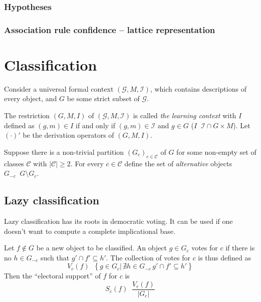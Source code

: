 \documentclass[a4paper]{article}
\newcommand{\obj}[1]{{\left\{ #1 \right \}}}
\newcommand{\brac}[1]{{\left ( #1 \right )}}
\newcommand{\induc}[1]{{\left . #1 \right \vert}}
\newcommand{\abs}[1]{{\left | #1 \right |}}
\newcommand{\Ical}{\mathcal{I}}
\newcommand{\Gcal}{\mathcal{G}}
\newcommand{\defn}{\mathop{\overset{\Delta}{=}}\nolimits}
\begin{document}
\subsubsection{Hypotheses} %
\label{ssub:hypotheses}


\subsubsection{Association rule confidence -- lattice representation} %
\label{ssub:association_rule_confidence_lattice_representation}





\section{Classification} %
\label{sec:classification}

Consider a universal formal context $(\Gcal, M, \Ical)$, which contains descriptions of every object, and $G$ be some strict subset of $\Gcal$.

The restriction $(G,M,I)$ of $(\Gcal,M,\Ical)$ is called \emph{the learning context} with $I$ defined as $(g,m)\in I$ if and only if $(g,m)\in \Ical$ and $g\in G$ ($I\defn \Ical \cap G\times M$). Let ${(\cdot)}'$ be the derivation operators of $(G,M,I)$.

Suppose there is a non-trivial partition $\brac{G_c}_{c\in \mathcal{C}}$ of $G$ for some non-empty set of classes $\mathcal{C}$ with $\abs{\mathcal{C}}\geq 2$. For every $c\in \mathcal{C}$ define the set of \emph{alternative} objects $G_{-c} \defn G\setminus G_c$.

\subsection{Lazy classification} %
\label{sub:lazy_classification}

Lazy classification has its roots in democratic voting. It can be used if one doesn't want to compute a complete implicational base.

Let $f\notin G$ be a new object to be classified. An object $g\in G_c$ votes for $c$ if there is no $h\in G_{-c}$ such that $g' \cap f'\subseteq h'$. The collection of votes for $c$ is thus defined as \[V_c(f) \defn\obj{ \induc{ g\in G_c }\, \nexists h\in G_{-c}\,g'\cap f'\subseteq h'}\] Then the ``electoral support'' of $f$ for $c$ is \[S_c(f)\defn \frac{V_c(f)}{\abs{G_c}}\]
\end{document}
